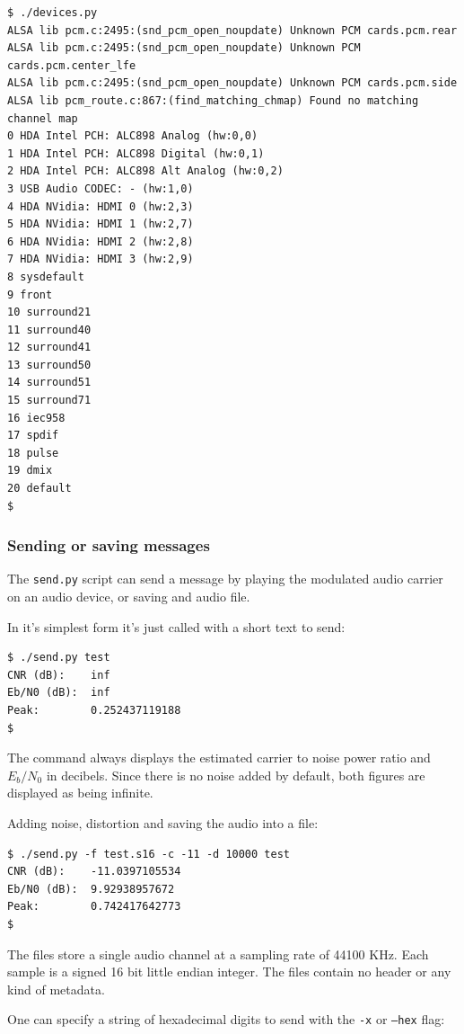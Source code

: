 \documentclass[a4paper]{article}
\begin{document}
\begin{lstlisting}
$ ./devices.py 
ALSA lib pcm.c:2495:(snd_pcm_open_noupdate) Unknown PCM cards.pcm.rear
ALSA lib pcm.c:2495:(snd_pcm_open_noupdate) Unknown PCM
cards.pcm.center_lfe
ALSA lib pcm.c:2495:(snd_pcm_open_noupdate) Unknown PCM cards.pcm.side
ALSA lib pcm_route.c:867:(find_matching_chmap) Found no matching
channel map
0 HDA Intel PCH: ALC898 Analog (hw:0,0)
1 HDA Intel PCH: ALC898 Digital (hw:0,1)
2 HDA Intel PCH: ALC898 Alt Analog (hw:0,2)
3 USB Audio CODEC: - (hw:1,0)
4 HDA NVidia: HDMI 0 (hw:2,3)
5 HDA NVidia: HDMI 1 (hw:2,7)
6 HDA NVidia: HDMI 2 (hw:2,8)
7 HDA NVidia: HDMI 3 (hw:2,9)
8 sysdefault
9 front
10 surround21
11 surround40
12 surround41
13 surround50
14 surround51
15 surround71
16 iec958
17 spdif
18 pulse
19 dmix
20 default
$
\end{lstlisting}

\subsubsection{Sending or saving messages}

The \texttt{send.py} script can send a message by playing the modulated
audio carrier on an audio device, or saving and audio file.

In it's simplest form it's just called with a short text to send:

\begin{lstlisting}
$ ./send.py test
CNR (dB):    inf
Eb/N0 (dB):  inf
Peak:        0.252437119188
$
\end{lstlisting}

The command always displays the estimated carrier to noise power ratio 
and $E_b/N_0$ in decibels. Since there is no noise added by default, 
both figures are displayed as being infinite.

Adding noise, distortion and saving the audio into a file:

\begin{lstlisting}
$ ./send.py -f test.s16 -c -11 -d 10000 test
CNR (dB):    -11.0397105534
Eb/N0 (dB):  9.92938957672
Peak:        0.742417642773
$
\end{lstlisting}

The files store a single audio channel at a sampling rate of 44100 KHz.
Each sample is a signed 16 bit little endian integer. The files contain
no header or any kind of metadata.

One can specify a string of hexadecimal digits to send with the 
\texttt{-x} or \texttt{--hex} flag:
\end{document}

